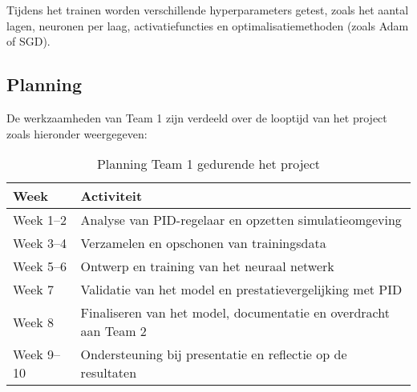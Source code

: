 Tijdens het trainen worden verschillende hyperparameters getest, zoals het aantal lagen, neuronen per laag, activatiefuncties en optimalisatiemethoden (zoals Adam of SGD).

\subsection{Planning}

  
De werkzaamheden van Team 1 zijn verdeeld over de looptijd van het project zoals hieronder weergegeven:
  
\begin{table}[ht!]
\centering
\begin{tabular}{|l|p{10cm}|}
\hline
\textbf{Week} & \textbf{Activiteit} \\
\hline
Week 1–2 & Analyse van PID-regelaar en opzetten simulatieomgeving \\
Week 3–4 & Verzamelen en opschonen van trainingsdata \\
Week 5–6 & Ontwerp en training van het neuraal netwerk \\
Week 7   & Validatie van het model en prestatievergelijking met PID \\
Week 8   & Finaliseren van het model, documentatie en overdracht aan Team 2 \\
Week 9–10 & Ondersteuning bij presentatie en reflectie op de resultaten \\
\hline
\end{tabular}
\caption{Planning Team 1 gedurende het project}
\end{table}
